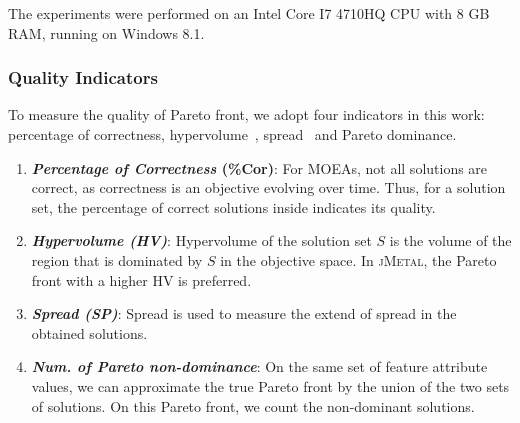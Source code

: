  The experiments were performed on an Intel Core I7 4710HQ CPU with 8 GB RAM, running on Windows 8.1.
%

\subsubsection{Quality Indicators}

To measure the quality of Pareto front, we adopt four indicators in this work:  percentage of correctness, hypervolume~\cite{DBLP:journals/tec/ZitzlerT991}, spread~\cite{DBLP:journals/tec/BradstreetWB08} and Pareto dominance.


\begin{enumerate}[label=\alph*), itemsep=0.1mm]

  \item \textbf{\emph{Percentage of Correctness} (\%Cor)}:  For MOEAs, not all solutions are correct, as correctness is an objective evolving over time. Thus, for a solution set, the percentage of correct solutions inside indicates its quality.
  \item \textbf{\emph{Hypervolume (HV)}}: Hypervolume of the solution set $S$ is the volume of the region that is dominated by $S$ in the objective space. In \textsc{jMetal}, %
      the Pareto front with a higher HV is preferred.


\item \textbf{\emph{Spread (SP)}}: Spread is  used to measure the extend of spread in the obtained solutions.%

\item \textbf{\emph{Num. of Pareto non-dominance}}: On the same set of feature attribute values, we can approximate the true Pareto front by the union of the two sets of solutions. On this Pareto front, we count the non-dominant solutions.
\end{enumerate}


